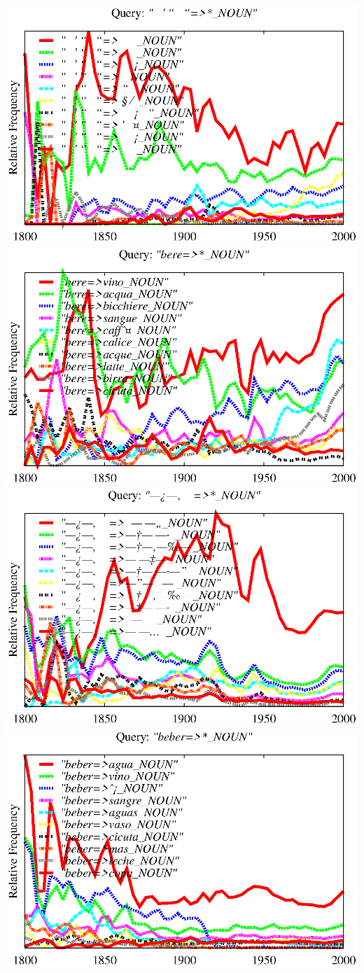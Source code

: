 \documentclass[11pt,a4paper]{article}
\begin{document}
{\includegraphics[width=.48\textwidth]{graphs/drink_HEB}
\includegraphics[width=.48\textwidth]{graphs/drink_ITA}
\includegraphics[width=.48\textwidth]{graphs/drink_RUS}
\includegraphics[width=.48\textwidth]{graphs/drink_SPA}}
\end{document}
